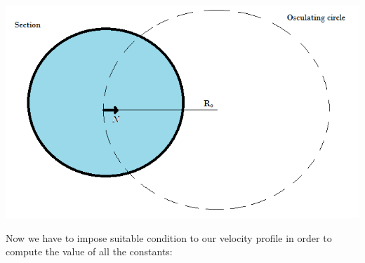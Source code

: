 \documentclass[a4paper]{report}
\begin{document}
		\begin{center}
			\includegraphics[scale=0.4]{Osculator_circle}
		\end{center}
Now we have to impose suitable condition to our velocity profile in order to compute the value of all the constants:
\end{document}
